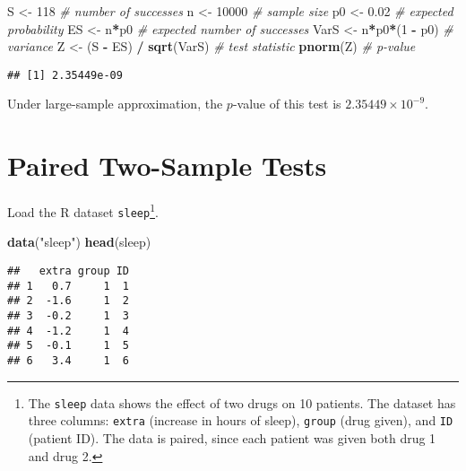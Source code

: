 \documentclass[
]{book}
\newenvironment{Shaded}{\begin{snugshade}}{\end{snugshade}}
\newcommand{\CommentTok}[1]{\textcolor[rgb]{0.56,0.35,0.01}{\textit{#1}}}
\newcommand{\DecValTok}[1]{\textcolor[rgb]{0.00,0.00,0.81}{#1}}
\newcommand{\FloatTok}[1]{\textcolor[rgb]{0.00,0.00,0.81}{#1}}
\newcommand{\KeywordTok}[1]{\textcolor[rgb]{0.13,0.29,0.53}{\textbf{#1}}}
\newcommand{\NormalTok}[1]{#1}
\newcommand{\OperatorTok}[1]{\textcolor[rgb]{0.81,0.36,0.00}{\textbf{#1}}}
\newcommand{\StringTok}[1]{\textcolor[rgb]{0.31,0.60,0.02}{#1}}
\begin{document}
\begin{Shaded}
\begin{Highlighting}[]
\NormalTok{S <-}\StringTok{ }\DecValTok{118} \CommentTok{# number of successes}
\NormalTok{n <-}\StringTok{ }\DecValTok{10000} \CommentTok{# sample size}
\NormalTok{p0 <-}\StringTok{ }\FloatTok{0.02} \CommentTok{# expected probability}
\NormalTok{ES <-}\StringTok{ }\NormalTok{n}\OperatorTok{*}\NormalTok{p0 }\CommentTok{# expected number of successes}
\NormalTok{VarS <-}\StringTok{ }\NormalTok{n}\OperatorTok{*}\NormalTok{p0}\OperatorTok{*}\NormalTok{(}\DecValTok{1} \OperatorTok{-}\StringTok{ }\NormalTok{p0) }\CommentTok{# variance}
\NormalTok{Z <-}\StringTok{ }\NormalTok{(S }\OperatorTok{-}\StringTok{ }\NormalTok{ES) }\OperatorTok{/}\StringTok{ }\KeywordTok{sqrt}\NormalTok{(VarS) }\CommentTok{# test statistic}
\KeywordTok{pnorm}\NormalTok{(Z) }\CommentTok{# p-value}
\end{Highlighting}
\end{Shaded}

\begin{verbatim}
## [1] 2.35449e-09
\end{verbatim}

Under large-sample approximation, the \(p\)-value of this test is
\(2.35449 \times 10^{-9}\).

\hypertarget{paired-two-sample-tests-1}{%
\section{Paired Two-Sample Tests}\label{paired-two-sample-tests-1}}

Load the R dataset
\texttt{sleep}\footnote{The \texttt{sleep} data shows the effect of two drugs on 10 patients.
  The dataset has three columns:
  \texttt{extra} (increase in hours of sleep),
  \texttt{group} (drug given), and
  \texttt{ID} (patient ID).
  The data is paired, since each patient was given both drug 1 and drug 2.}.

\begin{Shaded}
\begin{Highlighting}[]
\KeywordTok{data}\NormalTok{(}\StringTok{"sleep"}\NormalTok{)}
\KeywordTok{head}\NormalTok{(sleep)}
\end{Highlighting}
\end{Shaded}

\begin{verbatim}
##   extra group ID
## 1   0.7     1  1
## 2  -1.6     1  2
## 3  -0.2     1  3
## 4  -1.2     1  4
## 5  -0.1     1  5
## 6   3.4     1  6
\end{verbatim}
\end{document}
